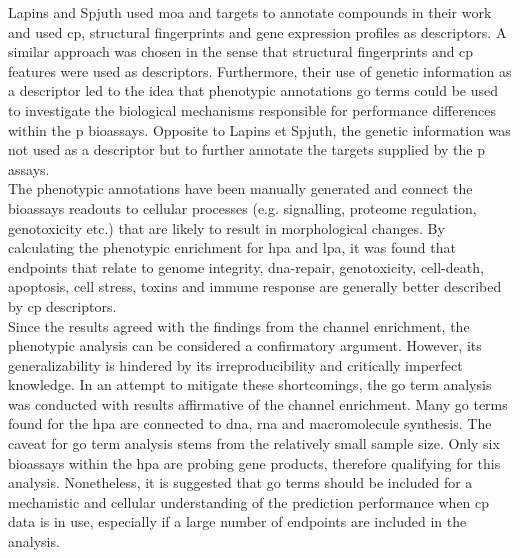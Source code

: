 Lapins and Spjuth\cite{Lapins2019} used \ac{moa} and targets to annotate compounds in their work and used \ac{cp}, structural fingerprints and gene expression profiles as descriptors. A similar approach was chosen in the sense that structural fingerprints and \ac{cp} features were used as descriptors. Furthermore, their use of genetic information as a descriptor led to the idea that phenotypic annotations \ac{go} terms could be used to investigate the biological mechanisms responsible for performance differences within the \acl{p} bioassays. Opposite to Lapins et Spjuth\cite{Lapins2019}, the genetic information was not used as a descriptor but to further annotate the targets supplied by the \acl{p} assays.\\
The phenotypic annotations have been manually generated and connect the bioassays readouts to cellular processes (e.g. signalling, proteome regulation, genotoxicity etc.) that are likely to result in morphological changes. By calculating the phenotypic enrichment for \acl{hpa} and \acl{lpa}, it was found that endpoints that relate to genome integrity, \ac{dna}-repair, genotoxicity, cell-death, apoptosis, cell stress, toxins and immune response are generally better described by \ac{cp} descriptors.\\
Since the results agreed with the findings from the channel enrichment, the phenotypic analysis can be considered a confirmatory argument. However, its generalizability is hindered by its irreproducibility and critically imperfect knowledge. In an attempt to mitigate these shortcomings, the \ac{go} term analysis was conducted with results affirmative of the channel enrichment. Many \ac{go} terms found for the \acl{hpa} are connected to \ac{dna}, \ac{rna} and macromolecule synthesis. The caveat for \ac{go} term analysis stems from the relatively small sample size. Only six bioassays within the \acl{hpa} are probing gene products, therefore qualifying for this analysis. Nonetheless, it is suggested that \ac{go} terms should be included for a mechanistic and cellular understanding of the prediction performance when \ac{cp} data is in use, especially if a large number of endpoints are included in the analysis.